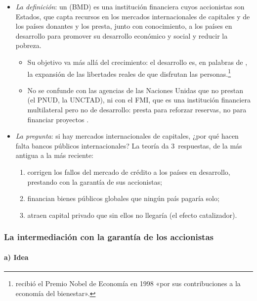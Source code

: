 \documentclass[11pt]{article}
\begin{document}
\begin{itemize}
\item \emph{La definición}: un  (BMD) es una institución financiera cuyos accionistas son Estados, que capta recursos en los mercados internacionales de capitales y de los países donantes y los presta, junto con conocimiento, a los países en desarrollo para promover su desarrollo económico y social y reducir la pobreza\nocite{OCDE2026Multilaterales}.
  \begin{itemize}
  \item Su objetivo va más allá del crecimiento: el desarrollo es, en palabras de , la expansión de las libertades reales de que disfrutan las personas\nocite{Sen1999}.\footnote{ recibió el Premio Nobel de Economía en 1998 «por sus contribuciones a la economía del bienestar»\nocite{Nobel1998Sen}.}
  \item No se confunde con las agencias de las Naciones Unidas que no prestan (el PNUD, la UNCTAD), ni con el FMI, que es una institución financiera multilateral pero no de desarrollo: presta para reforzar reservas, no para financiar proyectos .
  \end{itemize}
\item \emph{La pregunta}: si hay mercados internacionales de capitales, ¿por qué hacen falta bancos públicos internacionales? La teoría da 3~respuestas, de la más antigua a la más reciente:
  \begin{enumerate}
  \item corrigen los fallos del mercado de crédito a los países en desarrollo, prestando con la garantía de sus accionistas;
  \item financian bienes públicos globales que ningún país pagaría solo;
  \item atraen capital privado que sin ellos no llegaría (el efecto catalizador).
  \end{enumerate}
\end{itemize}

\subsubsection{La intermediación con la garantía de los accionistas}\label{sec:intermediacion}

\paragraph{a) Idea}
\end{document}
